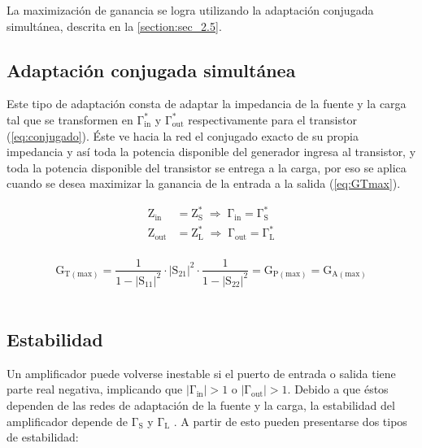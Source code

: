 \documentclass{article}
\begin{document}
La maximización de ganancia se logra utilizando la adaptación conjugada simultánea, descrita en la \autoref{section:sec_2.5}.
\\


\subsection{Adaptación conjugada simultánea} \label{section:sec_2.5} 
Este tipo de adaptación consta de adaptar la impedancia de la fuente y la carga tal que se transformen en $\mathrm{\Gamma_{in}^*}$ y $\mathrm{\Gamma_{out}^*}$ respectivamente para el transistor (\autoref{eq:conjugado}). Éste ve hacia la red el conjugado exacto de su propia impedancia y así toda la potencia disponible del generador ingresa al transistor, y toda la potencia disponible del transistor se entrega a la carga, por eso se aplica cuando se desea maximizar la ganancia de la entrada a la salida (\autoref{eq:GTmax}).

\begin{equation}
    \begin{aligned}
        \mathrm{Z_{in}}  & \mathrm{= Z_{S}^{*} \;\Rightarrow\; \Gamma_{in}  = \Gamma_{S}^{*}} \\
        \mathrm{Z_{out}} & \mathrm{= Z_{L}^{*} \;\Rightarrow\; \Gamma_{out} = \Gamma_{L}^{*}} 
    \end{aligned}
    \label{eq:conjugado}
\end{equation}
\\

\begin{equation}
    \mathrm{G_{T(max)} = \frac{1}{1 - |S_{11}|^2} \cdot |S_{21}|^2 \cdot \frac{1}{1 - |S_{22}|^2} = G_{P(max)} = G_{A(max)}}
    \label{eq:GTmax}
\end{equation}
\\



\subsection{Estabilidad} \label{section:sec_2.6}
Un amplificador puede volverse inestable si el puerto de entrada o salida tiene parte real negativa, implicando que $\mathrm{|\Gamma_{in}| > 1}$ o $\mathrm{|\Gamma_{out}| > 1}$. Debido a que éstos dependen de las redes de adaptación de la fuente y la carga, la estabilidad del amplificador depende de $\mathrm{\Gamma_{S}}$ y $\mathrm{\Gamma_{L}}$ \cite[págs.~564--568]{pozar_microwave}. A partir de esto pueden presentarse dos tipos de estabilidad:
\end{document}
